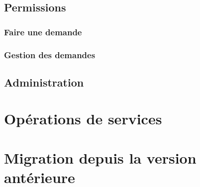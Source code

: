 \documentclass[11pt]{template}
\begin{document}
\subsection{Permissions}
\subsubsection{Faire une demande}
\subsubsection{Gestion des demandes}

\subsection{Administration}

\newpage
\section{Opérations de services}

\newpage
\section{Migration depuis la version antérieure}
\end{document}
